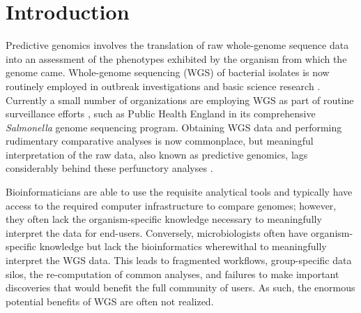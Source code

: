 \documentclass{bmcart}
\begin{document}


\section*{Introduction}
Predictive genomics involves the translation of raw whole-genome sequence data into an assessment of the phenotypes exhibited by the organism from which the genome came. Whole-genome sequencing (WGS) of bacterial isolates is now routinely employed in outbreak investigations and basic science research \cite{reuter_pilot_2013,fittipaldi_integrated_2013}. Currently a small number of organizations are employing WGS as part of routine surveillance efforts \cite{zankari_genotyping_2013,cody_real-time_2013}, such as Public Health England in its comprehensive \textit{Salmonella} genome sequencing program. Obtaining WGS data and performing rudimentary comparative analyses is now commonplace, but meaningful interpretation of the raw data, also known as predictive genomics, lags considerably behind these perfunctory analyses \cite{sherry_outbreak_2013}.

Bioinformaticians are able to use the requisite analytical tools and typically have access to the required computer infrastructure to compare genomes; however, they often lack the organism-specific knowledge necessary to meaningfully interpret the data for end-users. Conversely, microbiologists often have organism-specific knowledge but lack the bioinformatics wherewithal to meaningfully interpret the WGS data. This leads to fragmented workflows, group-specific data silos, the re-computation of common analyses, and failures to make important discoveries that would benefit the full community of users. As such, the enormous potential benefits of WGS are often not realized.
\end{document}
